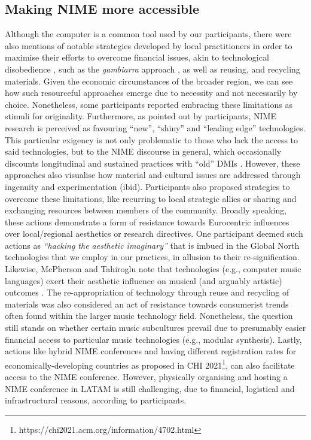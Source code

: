 \documentclass[sigconf]{nimeart}
\begin{document}
\subsection{Making NIME more accessible}\label{making-nime-more-accessible}

Although the computer is a common tool used by our participants, there were also mentions of notable strategies developed by local practitioners in order to maximise their efforts to overcome financial issues, akin to technological disobedience \cite{Oroza2012}, such as the \emph{gambiarra} approach \cite{NIME21_75,obici2017gambioluthiery}, as well as reusing, and recycling materials. Given the economic circumstances of the broader region, we can see how such resourceful approaches emerge due to necessity and not necessarily by choice. Nonetheless, some participants reported embracing these limitations as stimuli for originality. Furthermore, as pointed out by participants, NIME research is perceived as favouring ``new'', ``shiny'' and ``leading edge'' technologies. This particular exigency is not only problematic to those who lack the access to said technologies, but to the NIME discourse in general, which occasionally discounts longitudinal and sustained practices with ``old'' DMIs \cite{hayes2020addressing}. However, these approaches also visualise how material and cultural issues are addressed through ingenuity and experimentation (ibid). Participants also proposed strategies to overcome these limitations, like recurring to local strategic allies or sharing and exchanging resources between members of the community. Broadly speaking, these actions demonstrate a form of resistance towards Eurocentric influences over local/regional aesthetics or research directives. One participant deemed such actions as \emph{``hacking the aesthetic imaginary''} that is imbued in the Global North technologies that we employ in our practices, in allusion to their re-signification. Likewise, McPherson and Tahiroglu note that technologies (e.g., computer music languages) exert their aesthetic influence on musical (and arguably artistic) outcomes \cite{mcpherson2020idiomatic}. The re-appropriation of technology through reuse and recycling of materials was also considered an act of resistance towards consumerist trends often found within the larger music technology field. Nonetheless, the question still stands on whether certain music subcultures prevail due to presumably easier financial access to particular music technologies (e.g., modular synthesis). Lastly, actions like hybrid NIME conferences and having different registration rates for economically-developing countries as proposed in CHI 2021\footnote{https://chi2021.acm.org/information/4702.html}, can also facilitate access to the NIME conference. However, physically organising and hosting a NIME conference in LATAM is still challenging, due to financial, logistical and infrastructural reasons, according to participants.
\end{document}
